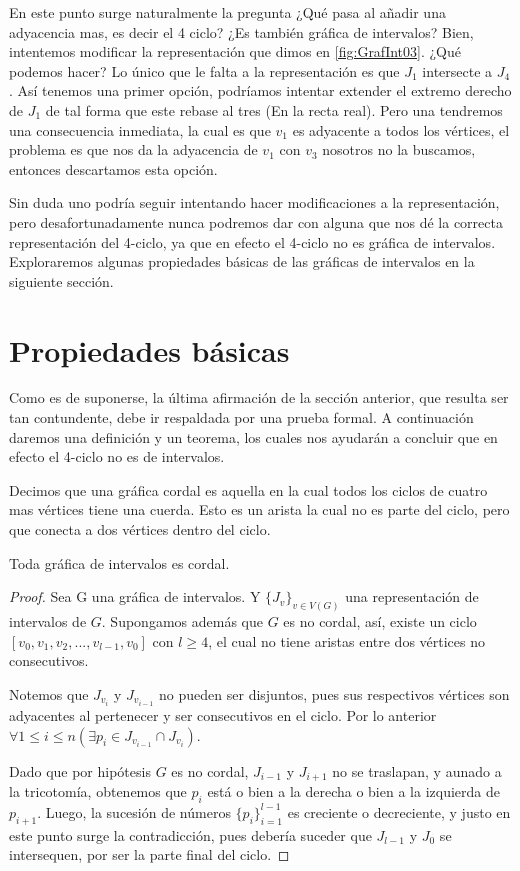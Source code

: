 En este punto surge naturalmente la pregunta ¿Qué pasa al añadir una adyacencia mas, es decir el 4 ciclo? ¿Es también gráfica de intervalos?
Bien, intentemos modificar la representación que dimos en \cref{fig:GrafInt03}. ¿Qué podemos hacer? Lo único que le falta a la representación es que $J_1$ intersecte a $J_4$. Así tenemos una primer opción, podríamos intentar extender el extremo derecho de $J_1$ de tal forma que este rebase al tres (En la recta real). Pero una tendremos una consecuencia inmediata, la cual es que $v_1$ es adyacente a todos los vértices, el problema es que nos da la adyacencia de $v_1$ con $v_3$ nosotros no la buscamos, entonces descartamos esta opción.

Sin duda uno podría seguir intentando hacer modificaciones a la representación, pero desafortunadamente nunca podremos dar con alguna que nos dé la correcta representación del 4-ciclo, ya que en efecto el 4-ciclo no es gráfica de intervalos.   Exploraremos algunas propiedades b\'asicas de las gr\'aficas de intervalos en la siguiente secci\'on.

\section{Propiedades b\'asicas}

Como es de suponerse, la última afirmación de la secci\'on anterior, que resulta ser tan contundente, debe ir respaldada por una prueba formal. 
A continuación daremos una definición y un teorema, los cuales nos ayudarán a concluir que en efecto el 4-ciclo no es de intervalos.

Decimos que una gráfica cordal es aquella en la cual todos los ciclos de cuatro mas vértices tiene una cuerda. Esto es un arista la cual no es parte del ciclo, pero que conecta a dos vértices dentro del ciclo.

\begin{teorema}
\label{teo:201}
    Toda gráfica de intervalos es cordal.
\end{teorema}

\begin{proof}
    Sea G una gráfica de intervalos. Y $\{ J_v \}_{v \in V(G)}$ una representación de intervalos de $G$.
    Supongamos además que $G$ es no cordal, así, existe un ciclo $[v_0,v_1,v_2,...,v_{l-1},v_0]$ con $l \geq 4$, el cual no tiene aristas entre dos vértices no consecutivos.
    
    Notemos que $J_{v_i}$ y $J_{v_{i-1}}$ no pueden ser disjuntos, pues sus respectivos vértices son adyacentes al pertenecer y ser consecutivos en el ciclo. Por lo anterior $\forall 1 \leq i \leq n  (\exists p_i \in J_{v_{i-1}}\cap J_{v_i})$.
    
    Dado que por hipótesis $G$ es no cordal, $J_{i-1}$ y $J_{i+1}$ no se traslapan, y aunado a la tricotomía, obtenemos que $p_i$ está o bien a la derecha o bien a la izquierda de $p_{i+1}$.
    Luego, la sucesión de números $\{ p_i \}_{i=1}^{l-1}$ es creciente o decreciente, y justo en este punto surge la contradicción, pues debería suceder que $J_{l-1}$ y $J_0$ se intersequen, por ser la parte final del ciclo.
\end{proof}

